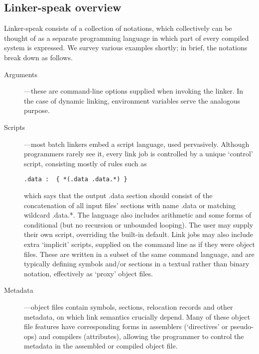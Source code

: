 \documentclass[preprint,10pt]{sigplanconf-pldi16}
\begin{document}
\subsection{Linker-speak overview}

Linker-speak consists of a collection of notations,
which collectively can be thought of as a separate programming language
in which part of every compiled system is expressed.
We survey various examples shortly; in brief, the notations
break down as follows.

\begin{description}

\item[Arguments] ---these are command-line options supplied when invoking the linker.
In the case of dynamic linking, environment variables serve the analogous purpose.

\item[Scripts] ---most batch linkers embed a script language, used pervasively.
Although programmers rarely see it, every link job is controlled by a unique `control' script,
consisting mostly of rules such as 

\begin{lstlisting}[language=plain,basicstyle=\footnotesize\sffamily]
  .data :  { *(.data .data.*) }
\end{lstlisting}

which says that the output \textsf{.data} section should consist of the concatenation of 
all input files' sections with name \textsf{.data} or matching wildcard \textsf{.data.*}.
The language also includes arithmetic and some forms of conditional (but no recursion or unbounded looping).
The user may supply their own script, overriding the built-in default.
Link jobs may also include extra `implicit' scripts, 
supplied on the command line as if they were object files.
These are written in a subset of the same command language, and are typically 
defining symbols and/or sections in a textual rather than binary notation, effectively
as `proxy' object files.

\item[Metadata] ---object files contain symbols, sections, relocation records
and other metadata, on which link semantics crucially depend. Many of these 
object file features have corresponding forms in assemblers 
(`directives' or pseudo-ops) and compilers (attributes), allowing the programmer
to control the metadata in the assembled or compiled object file.

\end{description}
\end{document}
